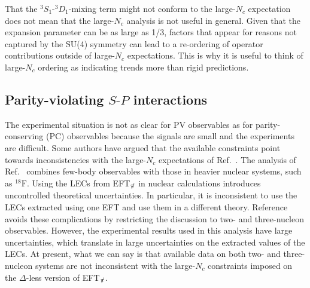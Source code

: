 \documentclass[nofootinbib, preprint, aps, prc, superscriptaddress,11pt]{revtex4-1}
\newcommand{\Nc}{\ensuremath{N_c}\xspace}
\newcommand{\threeS}{\ensuremath{{{}^{3}\!S_1}}\xspace}
\newcommand{\threeD}{\ensuremath{{{}^{3}\!D_1}}\xspace}
\newcommand\SD{\ensuremath{\threeS\text{-}\threeD}\xspace}
\newcommand\SP{\ensuremath{S\text{-}P}\xspace}
\newcommand{\1}{\mathbbm{1}}
\newcommand{\nopi}{\ensuremath{\pi\hskip-0.40em /}}
\newcommand{\eftnopi}{EFT$_{\nopi}$\xspace}
\newcommand{\D}{\ensuremath{\Delta}\xspace}
\begin{document}
That the \SD-mixing term might not conform to the large-\Nc expectation does not mean that the large-\Nc analysis is not useful in general. 
Given that the expansion parameter can be as large as 1/3, factors  that appear for reasons not captured by the SU(4) symmetry can lead to a re-ordering of operator contributions outside of large-\Nc expectations.
This is why it is useful to think of large-\Nc ordering as indicating trends more than rigid predictions. 



\subsection{Parity-violating \SP interactions}
\label{sec:parity}

The experimental situation is not as clear for PV observables as for parity-conserving (PC) observables because the signals are small and the experiments are difficult.  
Some authors \cite{Haxton:cipanp18,Vanasse:2018buq} have argued that the available constraints point towards inconsistencies with the large-\Nc expectations of Ref.~\cite{Schindler:2015nga}. 
The analysis of Ref.~\cite{Haxton:cipanp18} combines few-body observables with those in heavier nuclear systems, such as $^{18}\text{F}$. Using the LECs from \eftnopi in nuclear calculations introduces uncontrolled theoretical uncertainties. In particular, it is inconsistent to use the LECs extracted using one EFT and use them in a different theory. Reference \cite{Vanasse:2018buq} avoids these complications by restricting the discussion to two- and three-nucleon observables. However, the experimental results used in this analysis have large uncertainties, which translate in large uncertainties on the extracted values of the LECs.
At present, what we can say is that available data on both two- and three-nucleon systems are not inconsistent with the large-\Nc constraints imposed on the \D-less version of \eftnopi. 
\end{document}
